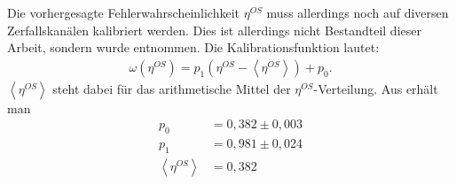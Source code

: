 Die vorhergesagte Fehlerwahrscheinlichkeit $\eta^{OS}$ muss allerdings noch auf diversen Zerfallskanälen kalibriert werden. Dies ist allerdings nicht Bestandteil dieser Arbeit, sondern wurde \cite{tagging} entnommen. Die Kalibrationsfunktion lautet:
\begin{align}
\omega(\eta^{OS}) = p_1\left(\eta^{OS}-\left\langle \eta^{OS} \right\rangle\right) + p_0 .
\end{align}
$\left\langle \eta^{OS} \right\rangle$ steht dabei für das arithmetische Mittel der $\eta^{OS}$-Verteilung. Aus \cite{tagging} erhält man
\begin{align}
p_0 &= 0,382 \pm 0,003 \\
p_1 &= 0,981 \pm 0,024 \\
\left\langle \eta^{OS} \right\rangle &= 0,382
\end{align}

